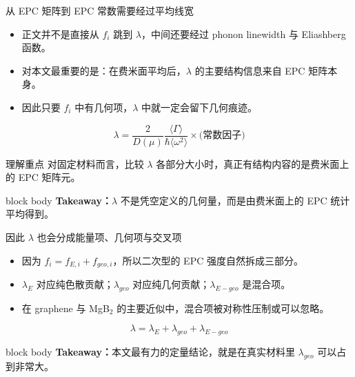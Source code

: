 \documentclass[aspectratio=169,11pt,UTF8]{ctexbeamer}
\newcommand{\takeaway}[1]{%
  \vfill
  \begin{beamercolorbox}[wd=\textwidth,sep=0.7ex,rounded=true]{block body}
    \small\textbf{Takeaway：}#1
  \end{beamercolorbox}
}
\begin{document}
\begin{frame}{从 EPC 矩阵到 EPC 常数需要经过平均线宽}
  \begin{itemize}
    \item 正文并不是直接从 $f_i$ 跳到 $\lambda$，中间还要经过 phonon linewidth 与 Eliashberg 函数。
    \item 对本文最重要的是：在费米面平均后，$\lambda$ 的主要结构信息来自 EPC 矩阵本身。
    \item 因此只要 $f_i$ 中有几何项，$\lambda$ 中就一定会留下几何痕迹。
  \end{itemize}
  \begin{equation*}
    \lambda
    =
    \frac{2}{D(\mu)}
    \frac{\langle \Gamma \rangle}{\hbar \langle \omega^2 \rangle}
    \times \text{(常数因子)}
  \end{equation*}
  \begin{block}{理解重点}
    对固定材料而言，比较 $\lambda$ 各部分大小时，真正有结构内容的是费米面上的 EPC 矩阵元。
  \end{block}
  \takeaway{$\lambda$ 不是凭空定义的几何量，而是由费米面上的 EPC 统计平均得到。}
\end{frame}

\begin{frame}{因此 $\lambda$ 也会分成能量项、几何项与交叉项}
  \begin{itemize}
    \item 因为 $f_i=f_{E,i}+f_{{geo},i}$，所以二次型的 EPC 强度自然拆成三部分。
    \item $\lambda_E$ 对应纯色散贡献；$\lambda_{geo}$ 对应纯几何贡献；$\lambda_{E-geo}$ 是混合项。
    \item 在 graphene 与 MgB$_2$ 的主要近似中，混合项被对称性压制或可以忽略。
  \end{itemize}
  \begin{equation*}
    \lambda = \lambda_E + \lambda_{geo} + \lambda_{E-geo}
  \end{equation*}
  \takeaway{本文最有力的定量结论，就是在真实材料里 $\lambda_{geo}$ 可以占到非常大。}
\end{frame}
\end{document}
